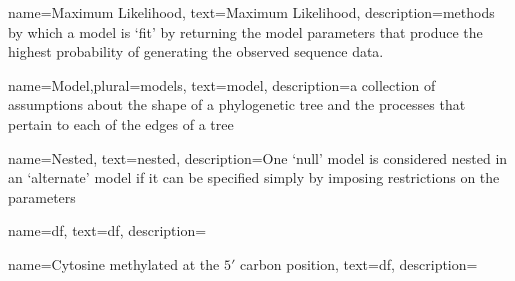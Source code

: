 {
        name=Maximum Likelihood,
        text=Maximum Likelihood,
        description={methods by which a model is ‘fit’ by returning the model parameters that produce the highest probability of generating the observed sequence data.}
}

{
        name={Model},plural={models},
        text={model},
        description={a collection of assumptions about the shape of a phylogenetic tree and the processes that pertain to each of the edges of a tree}
}

{
        name=Nested,
        text=nested,
        description={One `null’ model is considered nested in an `alternate’ model if it can be specified simply by imposing restrictions on the parameters }
}

{
        name=df,
        text=df,
        description={ }
}

{
        name=Cytosine methylated at the $5'$ carbon position,
        text=df,
        description={ }
}

